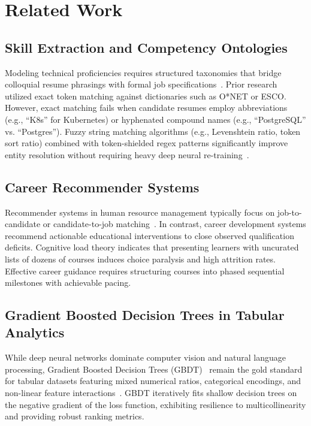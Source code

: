 \documentclass[conference]{IEEEtran}
\begin{document}
\section{Related Work}
\subsection{Skill Extraction and Competency Ontologies}
Modeling technical proficiencies requires structured taxonomies that bridge colloquial resume phrasings with formal job specifications~\cite{zhang2023job}. Prior research utilized exact token matching against dictionaries such as O*NET or ESCO. However, exact matching fails when candidate resumes employ abbreviations (e.g., ``K8s'' for Kubernetes) or hyphenated compound names (e.g., ``PostgreSQL'' vs. ``Postgres''). Fuzzy string matching algorithms (e.g., Levenshtein ratio, token sort ratio) combined with token-shielded regex patterns significantly improve entity resolution without requiring heavy deep neural re-training~\cite{pedregosa2011scikit}.

\subsection{Career Recommender Systems}
Recommender systems in human resource management typically focus on job-to-candidate or candidate-to-job matching~\cite{ricci2015recommender}. In contrast, career development systems recommend actionable educational interventions to close observed qualification deficits. Cognitive load theory indicates that presenting learners with uncurated lists of dozens of courses induces choice paralysis and high attrition rates. Effective career guidance requires structuring courses into phased sequential milestones with achievable pacing.

\subsection{Gradient Boosted Decision Trees in Tabular Analytics}
While deep neural networks dominate computer vision and natural language processing, Gradient Boosted Decision Trees (GBDT)~\cite{friedman2001greedy} remain the gold standard for tabular datasets featuring mixed numerical ratios, categorical encodings, and non-linear feature interactions~\cite{ke2017lightgbm}. GBDT iteratively fits shallow decision trees on the negative gradient of the loss function, exhibiting resilience to multicollinearity and providing robust ranking metrics.
\end{document}
